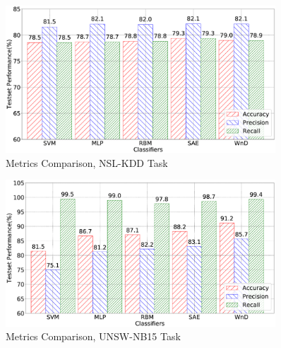\begin{figure}[h]
    \centering
    \includegraphics[width=0.9\textwidth]{CompareDL/figures/comp_accuracy_nsl.eps}
    \caption{Metrics Comparison, NSL-KDD Task}
    \label{CDL:Fig:CompAccuracyNSL}
\end{figure}

\begin{figure}[h]
    \centering
    \includegraphics[width=0.9\textwidth]{CompareDL/figures/comp_accuracy_unsw.eps}
    \caption{Metrics Comparison, UNSW-NB15 Task}
    \label{CDL:Fig:CompAccuracyUNSW}
\end{figure}

